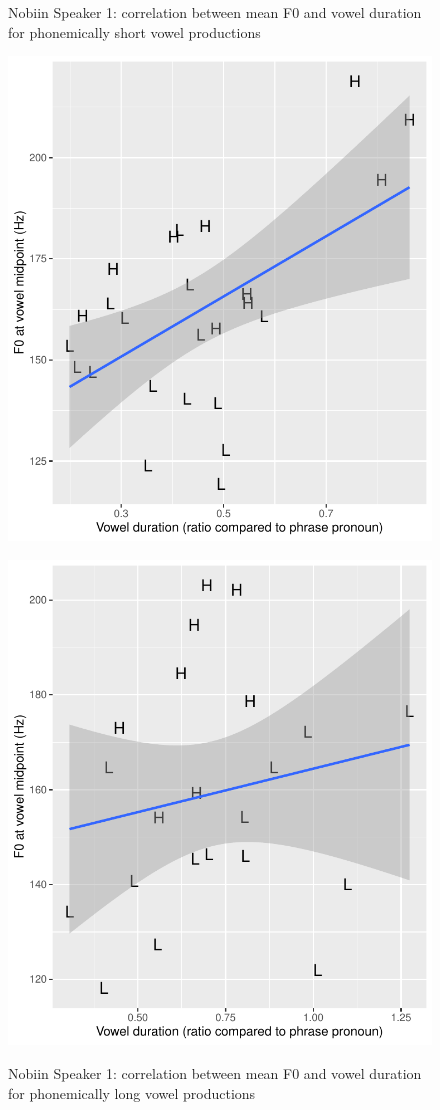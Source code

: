 \documentclass[output=paper]{langscibook}
\begin{document}
\begin{figure}
   \begin{floatrow}
     \captionsetup{margin=.05\linewidth}
     \ffigbox
     {\caption{Nobiin Speaker 1: correlation between mean F0 and vowel duration for phonemically short vowel productions\label{fig:oakley:TenutShortVowelsPitchvsDuration}}}
     {\includegraphics[width=.5\textwidth]{figures/TenutShortVowelsPitchvsDuration.pdf}}%
     \ffigbox
     {\caption{Nobiin Speaker 1: correlation between mean F0 and vowel duration for phonemically long vowel productions\label{fig:oakley:TenutLongVowelsPitchvsDuration}}}
     {\includegraphics[width=.5\textwidth]{figures/TenutLongVowelsPitchvsDuration.pdf}}
   \end{floatrow}
\end{figure}
   
\end{document}
